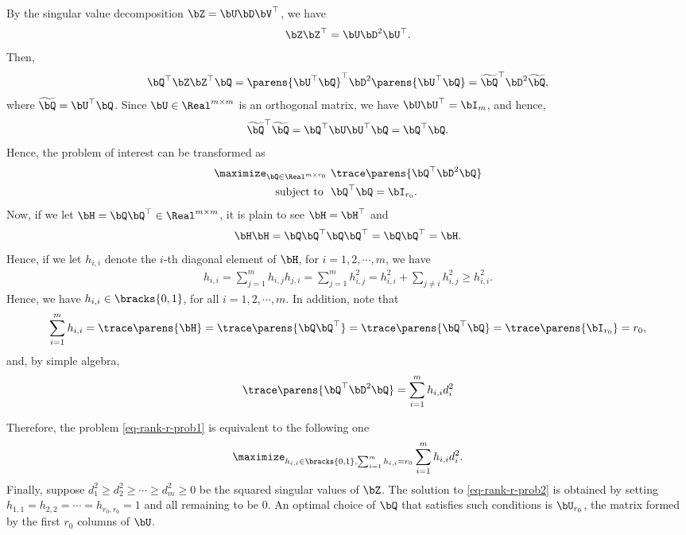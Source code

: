 \documentclass[12pt]{article}
\begin{document}
\begin{enumerate}[label=\textbf{\arabic*.}]
	By the singular value decomposition $\bZ = \bU \bD \bV^\top$, we have 
	\begin{align*}
		\bZ \bZ^\top = \bU \bD^2 \bU^\top. 
	\end{align*}
	Then, 
	\begin{align*}
		\bQ^\top \bZ \bZ^\top \bQ = \parens{\bU^\top \bQ}^\top \bD^2 \parens{\bU^\top \bQ} = \widetilde{\bQ}^\top \bD^2 \widetilde{\bQ}, 
	\end{align*}
	where $\widetilde{\bQ} = \bU^\top \bQ$. Since $\bU \in \Real^{m \times m}$ is an orthogonal matrix, we have $\bU \bU^\top = \bI_m$, and hence, 
	\begin{align*}
		\widetilde{\bQ}^\top \widetilde{\bQ} = \bQ^\top \bU \bU^\top \bQ = \bQ^\top \bQ. 
	\end{align*}
	Hence, the problem of interest can be transformed as 
	\begin{equation}\label{eq-rank-r-prob1}
		\begin{aligned}
			\maximize_{\bQ \in \Real^{m \times r_0}} & \ \trace \parens{\bQ^\top \bD^2 \bQ} \\ 
			\text{ subject to } & \ \bQ^\top \bQ = \bI_{r_0}. 
		\end{aligned}
	\end{equation}
	Now, if we let $\bH = \bQ \bQ^\top \in \Real^{m \times m}$, it is plain to see $\bH = \bH^\top$ and 
	\begin{align*}
		\bH \bH = \bQ \bQ^\top \bQ \bQ^\top = \bQ \bQ^\top = \bH. 
	\end{align*}
	Hence, if we let $h_{i,i}$ denote the $i$-th diagonal element of $\bH$, for $i = 1, 2, \cdots, m$, we have 
	\begin{align*}
		h_{i,i} = \sum_{j=1}^m h_{i,j} h_{j,i} = \sum_{j=1}^m h_{i,j}^2 = h_{i,i}^2 + \sum_{j \neq i} h_{i,j}^2 \ge h_{i,i}^2. 
	\end{align*}
	Hence, we have $h_{i,i} \in \bracks{0, 1}$, for all $i = 1, 2, \cdots, m$. In addition, note that 
	\begin{align*}
		\sum_{i=1}^m h_{i,i} = \trace \parens{\bH} = \trace \parens{\bQ \bQ^\top} = \trace \parens{\bQ^\top \bQ} = \trace \parens{\bI_{r_0}} = r_0, 
	\end{align*}
	and, by simple algebra, 
	\begin{align*}
		\trace \parens{\bQ^\top \bD^2 \bQ} = \sum_{i=1}^m h_{i,i} d_i^2
	\end{align*}
	
	Therefore, the problem \eqref{eq-rank-r-prob1} is equivalent to the following one 
	\begin{equation}\label{eq-rank-r-prob2}
		\maximize_{h_{i,i} \in \bracks{0,1}, \sum_{i=1}^m h_{i,i} = r_0} \sum_{i=1}^m h_{i,i} d_i^2. 
	\end{equation}
	Finally, suppose $d_1^2 \ge d_2^2 \ge \cdots \ge d_m^2 \ge 0$ be the squared singular values of $\bZ$. The solution to \eqref{eq-rank-r-prob2} is obtained by setting $h_{1,1} = h_{2,2} = \cdots = h_{r_0,r_0} = 1$ and all remaining to be 0. An optimal choice of $\bQ$ that satisfies such conditions is $\bU_{r_0}$, the matrix formed by the first $r_0$ columns of $\bU$. 
	

\end{enumerate}
\end{document}
